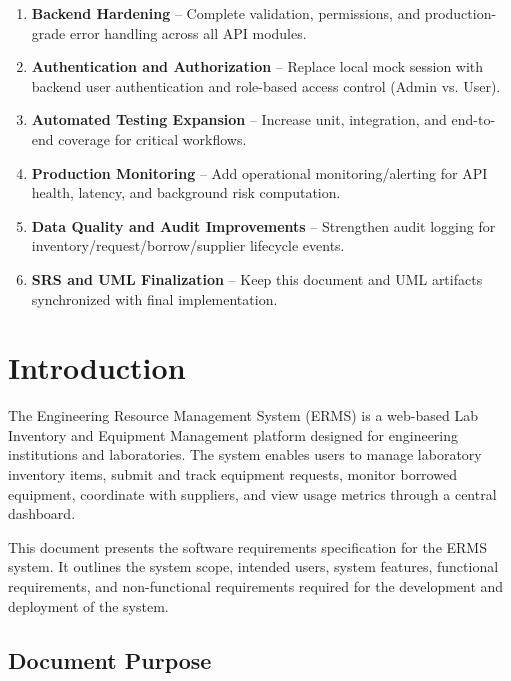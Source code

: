 \documentclass[12pt]{article}
\begin{document}
\begin{enumerate}
    \item \textbf{Backend Hardening} -- Complete validation, permissions, and production-grade error handling across all API modules.
    \item \textbf{Authentication and Authorization} -- Replace local mock session with backend user authentication and role-based access control (Admin vs. User).
    \item \textbf{Automated Testing Expansion} -- Increase unit, integration, and end-to-end coverage for critical workflows.
    \item \textbf{Production Monitoring} -- Add operational monitoring/alerting for API health, latency, and background risk computation.
    \item \textbf{Data Quality and Audit Improvements} -- Strengthen audit logging for inventory/request/borrow/supplier lifecycle events.
    \item \textbf{SRS and UML Finalization} -- Keep this document and UML artifacts synchronized with final implementation.
\end{enumerate}

\newpage


\section{Introduction}

The Engineering Resource Management System (ERMS) is a web-based Lab Inventory and Equipment Management platform designed for engineering institutions and laboratories. The system enables users to manage laboratory inventory items, submit and track equipment requests, monitor borrowed equipment, coordinate with suppliers, and view usage metrics through a central dashboard.

This document presents the software requirements specification for the ERMS system. It outlines the system scope, intended users, system features, functional requirements, and non-functional requirements required for the development and deployment of the system.

\subsection{Document Purpose}
\end{document}
